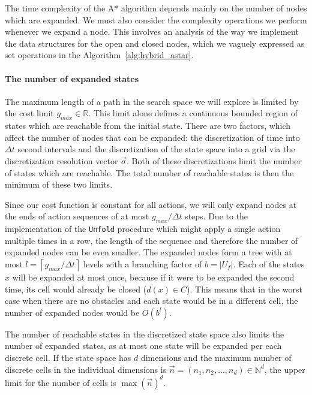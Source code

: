 The time complexity of the A* algorithm depends mainly on the number of nodes which are expanded. We must also consider the complexity operations we perform whenever we expand a node. This involves an analysis of the way we implement the data structures for the open and closed nodes, which we vaguely expressed as set operations in the Algorithm~\ref{alg:hybrid_astar}.

\paragraph{The number of expanded states} The maximum length of a path in the search space we will explore is limited by the cost limit $g_{max}\in \mathbb{R}$. This limit alone defines a continuous bounded region of states which are reachable from the initial state. There are two factors, which affect the number of nodes that can be expanded: the discretization of time into $\Delta t$ second intervals and the discretization of the state space into a grid via the discretization resolution vector $\vec{\sigma}$. Both of these discretizations limit the number of states which are reachable. The total number of reachable states is then the minimum of these two limits.

Since our cost function is constant for all actions, we will only expand nodes at the ends of action sequences of at most $g_{max}/\Delta t$ steps. Due to the implementation of the \texttt{Unfold} procedure which might apply a single action multiple times in a row, the length of the sequence and therefore the number of expanded nodes can be even smaller. The expanded nodes form a tree with at most $l=\left\lceil g_{max}/\Delta t\right\rceil$ levels with a branching factor of $b=|U_f|$. Each of the states $x$ will be expanded at most once, because if it were to be expanded the second time, its cell would already be closed ($d(x)\in C$). This means that in the worst case when there are no obstacles and each state would be in a different cell, the number of expanded nodes would be $O(b^l)$.

The number of reachable states in the discretized state space also limits the number of expanded states, as at most one state will be expanded per each discrete cell. If the state space has $d$ dimensions and the maximum number of discrete cells in the individual dimensions is $\vec{n}=\left(n_1, n_2, \ldots, n_d\right)\in \mathbb{N}^d$, the upper limit for the number of cells is $\max(\vec{n})^d$.

